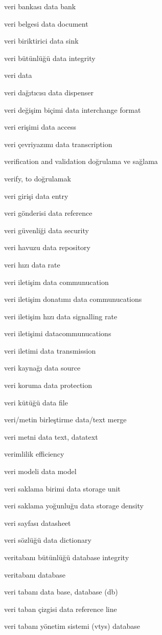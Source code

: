 \documentclass[12pt,fleqn]{article}\usepackage{../../common}
\begin{document}
veri bankası data bank

veri belgesi data document

veri biriktirici data sink

veri bütünlüğü data integrity

veri data

veri dağıtıcısı data dispenser

veri değişim biçimi data interchange format

veri erişimi data access

veri çevriyazımı data transcription

verification and validation doğrulama ve sağlama

verify, to doğrulamak

veri girişi data entry

veri gönderisi data reference

veri güvenliği data security

veri havuzu data repository

veri hızı data rate

veri iletişim data communucation

veri iletişim donatımı data communucations

veri iletişim hızı data signalling rate

veri iletişimi datacommunucations

veri iletimi data transmission

veri kaynağı data source

veri koruma data protection

veri kütüğü data file

veri/metin birleştirme data/text merge

veri metni data text, datatext

verimlilik efficiency

veri modeli data model

veri saklama birimi data storage unit

veri saklama yoğunluğu data storage density

veri sayfası datasheet

veri sözlüğü data dictionary

veritabanı bütünlüğü database integrity

veritabanı database

veri tabanı data base, database (db)

veri taban çizgisi data reference line

veri tabanı yönetim sistemi (vtys) database
\end{document}
